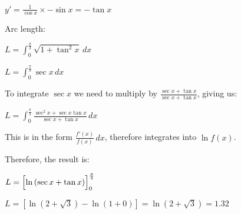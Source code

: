 \documentclass[../main.tex]{subfiles}
\begin{document}
\begin{enumerate}[itemsep=0.7cm]
    $y'=\frac{1}{\cos{x}}\times -\sin{x}=-\tan{x}$

    Arc length:

    $L=\int_0^{\frac{\pi}{3}} \sqrt{1+\tan^2{x}}\,dx$

    $L=\int_0^{\frac{\pi}{3}} \sec{x}\,dx$

    To integrate $\sec{x}$ we need to multiply by $\frac{\sec{x}+\tan{x}}{\sec{x}+\tan{x}}$, giving us:

    $L=\int_0^{\frac{\pi}{3}} \frac{\sec^2{x}+\sec{x}\tan{x}}{\sec{x}+\tan{x}}\,dx$

    This is in the form $\frac{f'(x)}{f(x)}\,dx$, therefore integrates into $\ln{f(x)}$.

    Therefore, the result is:

    $L= \Bigl[\ln{(\sec{x}+\tan{x})}\Bigr]_0^{\frac{\pi}{3}}$

    $L=[\ln{(2+\sqrt{3})}-\ln{(1+0)}]=\ln{(2+\sqrt{3})}=1.32$

\end{enumerate}
\end{document}
